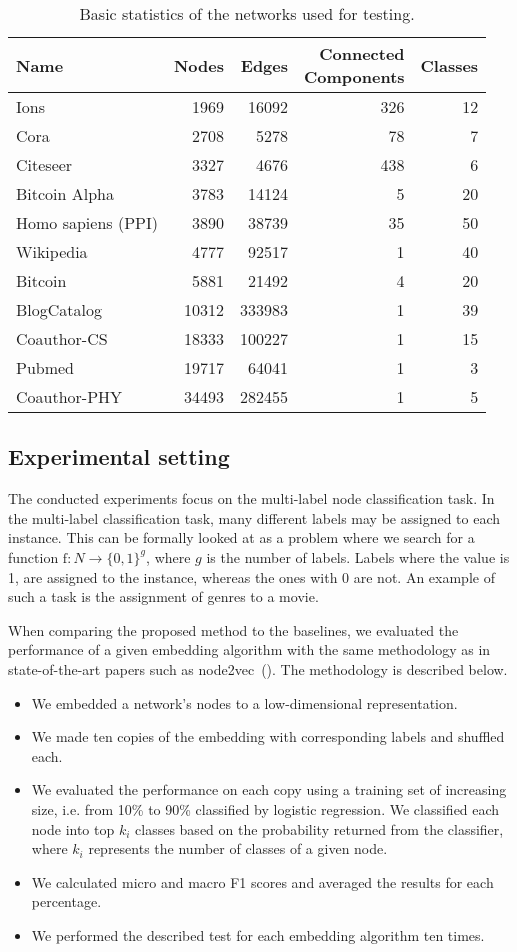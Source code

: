 \documentclass[twoside,11pt]{article}
\begin{document}
\begin{table}
\centering
\caption{Basic statistics of the networks used for testing.}
\begin{tabular}{lrrrr}
\hline
Name & Nodes & Edges & \makecell{Connected \\ Components} & Classes\\
\hline
Ions&   1969&   16092&  326&    12\\
Cora&   2708&   5278&   78& 7\\
Citeseer&   3327&   4676&   438&    6\\
Bitcoin Alpha&    3783&   14124&  5&  20\\
Homo sapiens (PPI)&   3890&   38739&  35& 50\\
Wikipedia&    4777&   92517&  1&  40\\
Bitcoin&    5881&   21492&  4&  20\\
BlogCatalog&    10312&  333983& 1&  39\\
Coauthor-CS&    18333& 100227& 1& 15\\
Pubmed& 19717&  64041&  1&  3\\
Coauthor-PHY&    34493& 282455& 1& 5\\
\hline
\end{tabular}
\label{tab1}
\end{table}

\subsection{Experimental setting}
The conducted experiments focus on the multi-label node classification task. In the multi-label classification task, many different labels may be assigned to each instance. This can be formally looked at as a problem where we search for a function $\textrm{f}: N \rightarrow \{0,1\}^g$, where $g$ is the number of labels. Labels where the value is 1, are assigned to the instance, whereas the ones with 0 are not. An example of such a task is the assignment of genres to a movie.

When comparing the proposed method to the baselines, we evaluated the performance of a given embedding algorithm with the same methodology as in state-of-the-art papers such as node2vec~(\cite{grover2016node2vec}). The methodology is described below.

\begin{itemize}
\item We embedded a network's nodes to a low-dimensional representation.
\item We made ten copies of the embedding with corresponding labels and shuffled each.
\item We evaluated the performance on each copy using a training set of increasing size, i.e. from 10\% to 90\% classified by logistic regression. We classified each node into top $k_i$ classes based on the probability returned from the classifier, where $k_i$ represents the number of classes of a given node.
\item We calculated micro and macro F1 scores and averaged the results for each percentage.
\item We performed the described test for each embedding algorithm ten times.
\end{itemize}
\end{document}
